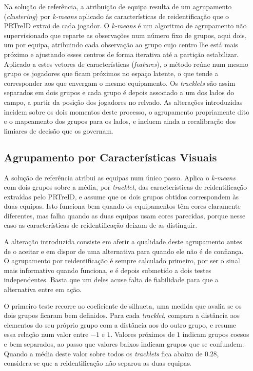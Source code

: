 Na solução de referência, a atribuição de equipa resulta de um agrupamento (\emph{clustering}) por
\emph{k-means} aplicado às características de reidentificação que o PRTreID extrai de cada jogador. O
\emph{k-means} é um algoritmo de agrupamento não supervisionado que reparte as observações num
número fixo de grupos, aqui dois, um por equipa, atribuindo cada observação ao grupo cujo centro lhe
está mais próximo e ajustando esses centros de forma iterativa até a partição estabilizar. Aplicado
a estes vetores de características (\emph{features}), o método reúne num mesmo grupo os jogadores que
ficam próximos no espaço latente, o que tende a corresponder aos que envergam o mesmo equipamento.
Os \emph{tracklets} são assim separados em dois grupos e cada grupo é depois associado a um dos lados
do campo, a partir da posição dos jogadores no relvado. As alterações introduzidas incidem sobre os
dois momentos deste processo, o agrupamento propriamente dito e o mapeamento dos grupos para os
lados, e incluem ainda a recalibração dos limiares de decisão que os governam.


\subsection{Agrupamento por Características Visuais}

A solução de referência atribui as equipas num único passo. Aplica o \emph{k-means} com dois grupos
sobre a média, por \emph{tracklet}, das características de reidentificação extraídas pelo PRTreID, e
assume que os dois grupos obtidos correspondem às duas equipas. Isto funciona bem quando os
equipamentos têm cores claramente diferentes, mas falha quando as duas equipas usam cores parecidas,
porque nesse caso as características de reidentificação deixam de as distinguir.

A alteração introduzida consiste em aferir a qualidade deste agrupamento antes de o aceitar e em
dispor de uma alternativa para quando ele não é de confiança. O agrupamento por reidentificação é
sempre calculado primeiro, por ser o sinal mais informativo quando funciona, e é depois submetido a
dois testes independentes. Basta que um deles acuse falta de fiabilidade para que a alternativa
entre em ação.

O primeiro teste recorre ao coeficiente de silhueta, uma medida que avalia se os dois grupos ficaram
bem definidos. Para cada \emph{tracklet}, compara a distância aos elementos do seu próprio grupo com
a distância aos do outro grupo, e resume essa relação num valor entre $-1$ e $1$. Valores próximos de
$1$ indicam grupos coesos e bem separados, ao passo que valores baixos indicam grupos que se
confundem. Quando a média deste valor sobre todos os \emph{tracklets} fica abaixo de $0.28$,
considera-se que a reidentificação não separou as duas equipas.


